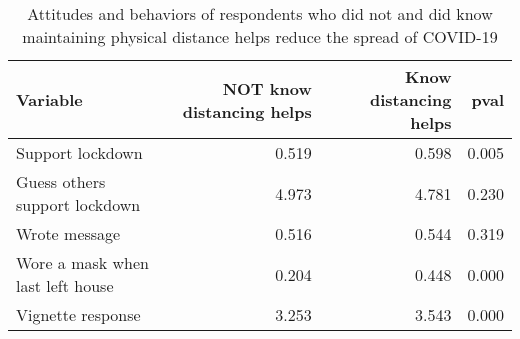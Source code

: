 \begin{table}[ht]
\centering
\caption{Attitudes and behaviors of respondents who did not and did know maintaining physical distance helps reduce the spread of COVID-19} 
\label{tab:notknowdist_outvars}
\begin{tabular}{lrrr}
  \hline
Variable & NOT know distancing helps & Know distancing helps & pval \\ 
  \hline
Support lockdown & 0.519 & 0.598 & 0.005 \\ 
  Guess others support lockdown & 4.973 & 4.781 & 0.230 \\ 
  Wrote message & 0.516 & 0.544 & 0.319 \\ 
  Wore a mask when last left house & 0.204 & 0.448 & 0.000 \\ 
  Vignette response & 3.253 & 3.543 & 0.000 \\ 
   \hline
\end{tabular}
\end{table}

